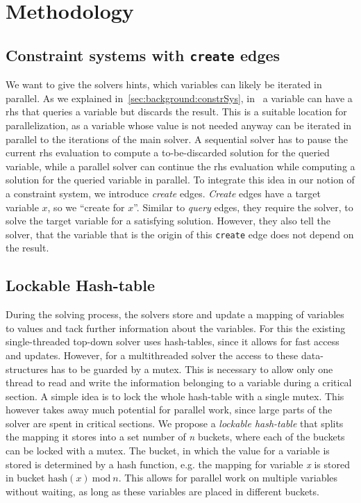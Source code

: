 \section{Methodology}
\label{sec:method}

  \subsection{Constraint systems with \texttt{create} edges}
  \label{sec:method:create}
  We want to give the solvers hints, which variables can likely be iterated in parallel. As we explained in~\autoref{sec:background:constrSys}, in \gob\ a variable can have a \ac{rhs} that queries a variable but discards the result. This is a suitable location for parallelization, as a variable whose value is not needed anyway can be iterated in parallel to the iterations of the main solver. A sequential solver has to pause the current \ac{rhs} evaluation to compute a to-be-discarded solution for the queried variable, while a parallel solver can continue the \ac{rhs} evaluation while computing a solution for the queried variable in parallel.
  To integrate this idea in our notion of a constraint system, we introduce \textit{create} edges. \textit{Create} edges have a target variable $x$, so we ``create for $x$''. Similar to \textit{query} edges, they require the solver, to solve the target variable for a satisfying solution. However, they also tell the solver, that the variable that is the origin of this \texttt{create} edge does not depend on the result.

  \subsection{Lockable Hash-table}
  \label{sec:method:LHM}
  During the solving process, the solvers store and update a mapping of variables to values and tack further information about the variables. For this the existing single-threaded top-down solver uses hash-tables, since it allows for fast access and updates. However, for a multithreaded solver the access to these data-structures has to be guarded by a mutex. This is necessary to allow only one thread to read and write the information belonging to a variable during a critical section. 
  A simple idea is to lock the whole hash-table with a single mutex. This however takes away much potential for parallel work, since large parts of the solver are spent in critical sections.
  We propose a \textit{lockable hash-table} that splits the mapping it stores into a set number of \textit{n} buckets, where each of the buckets can be locked with a mutex. The bucket, in which the value for a variable is stored is determined by a hash function, e.g. the mapping for variable \textit{x} is stored in bucket $\text{hash}(x)\ \text{mod}\ n$. This allows for parallel work on multiple variables without waiting, as long as these variables are placed in different buckets.

